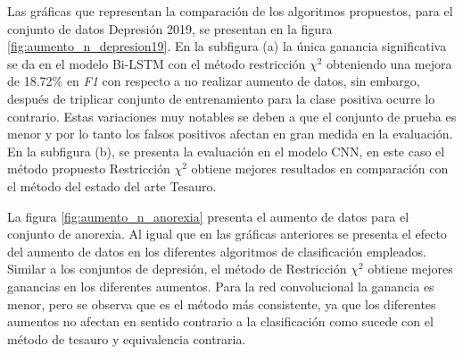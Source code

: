 Las gráficas que representan la comparación de los algoritmos propuestos, para el conjunto de datos Depresión 2019, se presentan en la figura \ref{fig:aumento_n_depresion19}. En la subfigura (a) la única ganancia significativa se da en el modelo Bi-LSTM con el método restricción $\chi^2$ obteniendo una mejora de 18.72\% en \textit{F1} con respecto a no realizar aumento de datos, sin embargo, después de triplicar conjunto de entrenamiento para la clase positiva ocurre lo contrario. Estas variaciones muy notables se deben a que el conjunto de prueba es menor y por lo tanto los falsos positivos afectan en gran medida en la evaluación. En la subfigura (b), se presenta la evaluación en el modelo CNN, en este caso el método propuesto Restricción $\chi^2$ obtiene mejores resultados en comparación con el método del estado del arte Tesauro. 


La figura \ref{fig:aumento_n_anorexia} presenta el aumento de datos para el conjunto de anorexia. Al igual que en las gráficas anteriores se presenta el efecto del aumento de datos en los diferentes algoritmos de clasificación empleados. Similar a los conjuntos de depresión, el método de Restricción $\chi^2$ obtiene mejores ganancias en los diferentes aumentos. Para la red convolucional la ganancia es menor, pero se observa que es el método más consistente, ya que los diferentes aumentos no afectan en sentido contrario a la clasificación como sucede con el método de tesauro y equivalencia contraria. 


